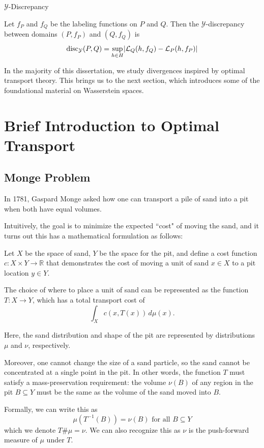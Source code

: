 \begin{definition}{$\mathcal{Y}$-Discrepancy}

	Let $f_P$ and $f_Q$ be the labeling functions on $P$ and $Q$. Then the $\mathcal{Y}$-discrepancy between domains $(P,f_P)$ and $(Q,f_Q)$ is
	\[
	\textrm{disc}_{\mathcal{Y}}(P,Q) = \sup_{h\in H} \lvert\mathcal{L}_Q(h,f_Q)-\mathcal{L}_P(h,f_P)\rvert
	\]
\end{definition}

In the majority of this dissertation, we study divergences inspired by optimal transport theory. This brings us to the next section, which introduces some of the foundational material on Wasserstein spaces.

\section{Brief Introduction to Optimal Transport}

\subsection*{Monge Problem}

In 1781, Gaspard Monge asked how one can transport a pile of sand into a pit when both have equal volumes.

Intuitively, the goal is to minimize the expected ``cost" of moving the sand, and it turns out this has a mathematical formulation as follows:

Let $X$ be the space of sand, $Y$ be the space for the pit, and define a cost function $c:X\times Y\to \mathbb{R}$ that demonstrates the cost of moving a unit of sand $x\in X$ to a pit location $y\in Y$.

The choice of where to place a unit of sand can be represented as the function $T:X\to Y$, which has a total transport cost of
\[
\int_{X} c(x,T(x))\,d\mu(x).
\]

Here, the sand distribution and shape of the pit are represented by distributions $\mu$ and $\nu$, respectively.

Moreover, one cannot change the size of a sand particle, so the sand cannot be concentrated at a single point in the pit. In other words, the function $T$ must satisfy a mass-preservation requirement: the volume $\nu(B)$ of any region in the pit $B\subseteq Y$ must be the same as the volume of the sand moved into $B$.

Formally, we can write this as
\[ 
\mu(T^{-1}(B))=\nu(B) \text{ for all } B\subseteq Y
\] which we denote $T\#\mu=\nu$. We can also recognize this as $\nu$ is the push-forward measure of $\mu$ under $T$.


